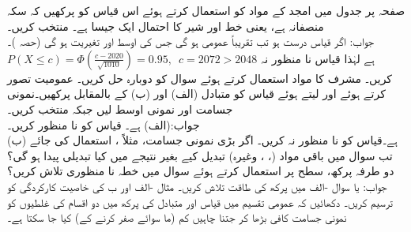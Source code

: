 \quad 
صفحہ  پر جدول  میں امجد کے مواد کو استعمال کرتے ہوئے اس قیاس کو پرکھیں کہ سکہ منصفانہ ہے، یعنی خط اور شیر کا احتمال ایک جیسا ہے۔ منتخب کریں۔\\
جواب:\quad
اگر قیاس  درست ہو تب  تقریباً عمومی ہو گی جس کی اوسط  اور تغیریت  ہو گی (حصہ )۔\\
$P(X\le c)=\Phi(\tfrac{c-2020}{\sqrt{1010}})=0.95,\,\,\,c=2072>2048$
ہے لہٰذا قیاس نا منظور نہ کریں۔
\quad
مشرف کا مواد استعمال کرتے ہوئے سوال  کو دوبارہ حل کریں۔
\quad
عمومیت تصور کرتے ہوئے اور  لیتے ہوئے قیاس  کو متبادل (الف)  اور (ب)  کے بالمقابل پرکھیں۔نمونی جسامت  اور نمونی اوسط  لیں جبکہ  منتخب کریں۔\\
جواب:\quad (الف)  ہے۔ قیاس کو نا منظور کریں۔\\
(ب)  ہے۔قیاس کو نا منظور نہ کریں۔
\quad
اگر بڑی نمونی جسامت، مثلاً ، استعمال کی جائے تب سوال  میں باقی مواد (، ، وغیرہ) تبدیل کیے بغیر نتیجے میں کیا تبدیلی پیدا ہو گی؟ 
\quad
دو طرفہ پرکھ،  سطح پر استعمال کرتے ہوئے سوال  میں خطہ نا منظوری تلاش کریں؟\\
جواب:\quad {} یا 
\quad
سوال -الف میں پرکھ کی طاقت تلاش کریں۔
\quad
مثال -الف اور ب کی خاصیت کارکردگی کو ترسیم کریں۔  
\quad
دکھائیں کہ عمومی تقسیم میں قیاس  اور متبادل  کی پرکھ میں  دو اقسام کی غلطیوں کو نمونی جسامت کافی بڑھا کر  جتنا چاہیں کم (ما سوائے صفر کرنے کے) کیا جا سکتا ہے۔
